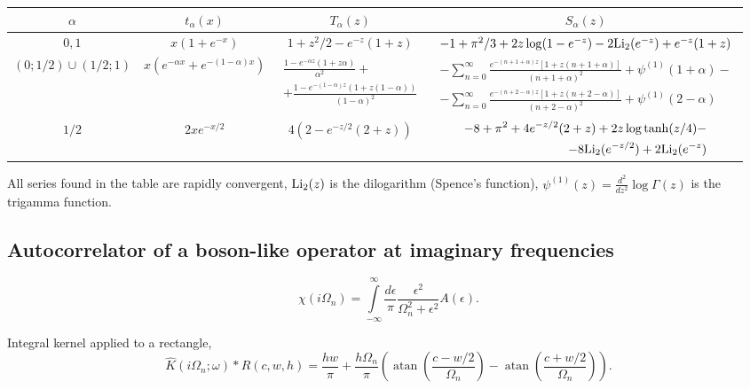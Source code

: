 \documentclass[]{article}
\DeclareMathOperator{\atan}{atan}
\begin{document}
\begin{center}
	\footnotesize
	\begin{tabular}{|c|c|c|c|}
		\hline
		$\alpha$ & $t_\alpha(x)$ & $T_\alpha(z)$ & $S_\alpha(z)$ \\
		\hline
		$0,1$ & $x(1+e^{-x})$ & $1+z^2/2-e^{-z}(1+z)$ &
		$-1+\pi^2/3+2z\log(1-e^{-z})-2\mathrm{Li}_2(e^{-z})+e^{-z}(1+z)$ \\
		\hline
		$(0;1/2)\cup(1/2;1)$ & $x(e^{-\alpha x}+e^{-(1-\alpha)x})$ &
		$\begin{array}{c}\frac{1-e^{-\alpha z}(1+z\alpha)}{\alpha^2}+\\+
		\frac{1-e^{-(1-\alpha) z}(1+z(1-\alpha))}{(1-\alpha)^2}\end{array}$ &$\begin{aligned}-\sum_{n=0}^\infty\frac{e^{-(n+1+\alpha)z}[1+z(n+1+\alpha)]}
		{(n+1+\alpha)^2} +\psi^{(1)}(1+\alpha) -\\
		-\sum_{n=0}^\infty\frac{e^{-(n+2-\alpha)z}[1+z(n+2-\alpha)]}
		{(n+2-\alpha)^2} +\psi^{(1)}(2-\alpha)\end{aligned}$ \\
		\hline
		$1/2$ & $2xe^{-x/2}$ & $4(2-e^{-z/2}(2+z))$ &
		$\begin{aligned}-8+\pi^2+4e^{-z/2}(2+z)+2z\log\tanh(z/4)-\\
		-8\mathrm{Li}_2(e^{-z/2})+2\mathrm{Li}_2(e^{-z})\end{aligned}$ \\
		\hline
	\end{tabular}
\end{center}

All series found in the table are rapidly convergent, $\mathrm{Li}_2(z)$ is the dilogarithm (Spence's function),
$\psi^{(1)}(z) = \frac{d^2}{dz^2}\log\Gamma(z)$ is the trigamma function.

\subsection{Autocorrelator of a boson-like operator at imaginary frequencies}
\label{bosonautocorr_imfreq}
\begin{equation}
\chi(i\Omega_n) = \int\limits_{-\infty}^\infty
\frac{d\epsilon}{\pi}\frac{\epsilon^2}{\Omega_n^2+\epsilon^2} A(\epsilon).
\end{equation}

Integral kernel applied to a rectangle,
\begin{equation}
\hat K(i\Omega_n;\omega)*R(c,w,h) =
\frac{hw}{\pi} + \frac{h\Omega_n}{\pi}\left(
\atan\left(\frac{c-w/2}{\Omega_n}\right) - \atan\left(\frac{c+w/2}{\Omega_n}\right)
\right).
\end{equation}
\end{document}
